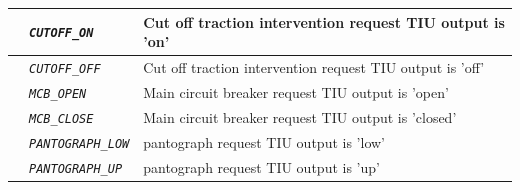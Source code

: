 \begin{itemize}
\begin{longtable}{|l|l|l|}
			&	\begin{minipage}[t]{0.40\linewidth} \emph{\texttt{CUTOFF\_ON}} \end{minipage}
			&	\begin{minipage}[t]{0.38\linewidth} Cut off traction intervention request TIU output is ’on’ \end{minipage} \\

			\hline

			&	\begin{minipage}[t]{0.40\linewidth} \emph{\texttt{CUTOFF\_OFF}} \end{minipage}
			&	\begin{minipage}[t]{0.38\linewidth} Cut off traction intervention request TIU output is ’off’ \end{minipage} \\

			\hline

			&	\begin{minipage}[t]{0.40\linewidth} \emph{\texttt{MCB\_OPEN}} \end{minipage}
			&	\begin{minipage}[t]{0.38\linewidth} Main circuit breaker request TIU output is ’open’ \end{minipage} \\

			\hline

			&	\begin{minipage}[t]{0.40\linewidth} \emph{\texttt{MCB\_CLOSE}} \end{minipage}
			&	\begin{minipage}[t]{0.38\linewidth} Main circuit breaker request TIU output is ’closed’ \end{minipage} \\

			\hline

			&	\begin{minipage}[t]{0.40\linewidth} \emph{\texttt{PANTOGRAPH\_LOW}} \end{minipage}
			&	\begin{minipage}[t]{0.38\linewidth} pantograph request TIU output is ’low’ \end{minipage} \\

			\hline

			&	\begin{minipage}[t]{0.40\linewidth} \emph{\texttt{PANTOGRAPH\_UP}} \end{minipage}
			&	\begin{minipage}[t]{0.38\linewidth} pantograph request TIU output is ’up’ \end{minipage} \\


\end{longtable}
\end{itemize}

